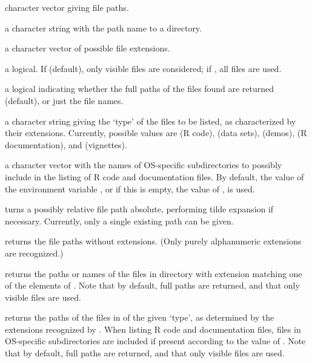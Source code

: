 %
\begin{Arguments}
\begin{ldescription}
\item[\code{x}] character vector giving file paths.
\item[\code{dir}] a character string with the path name to a directory.
\item[\code{exts}] a character vector of possible file extensions.
\item[\code{all.files}] a logical.  If  (default), only visible
files are considered; if , all files are used.
\item[\code{full.names}] a logical indicating whether the full paths of the
files found are returned (default), or just the file names.
\item[\code{type}] a character string giving the `type' of the files
to be listed, as characterized by their extensions.  Currently,
possible values are  (R code),  (data
sets),  (demos),  (R documentation), and
 (vignettes).
\item[\code{OS\_subdirs}] a character vector with the names of OS-specific
subdirectories to possibly include in the listing of R code and
documentation files.  By default, the value of the environment
variable , or if this is empty, the value of
, is used.
\end{ldescription}
\end{Arguments}
%
\begin{Details}\relax
{} turns a possibly relative file path
absolute, performing tilde expansion if necessary.  Currently, only a
single existing path can be given.

 returns the file paths without extensions.
(Only purely alphanumeric extensions are recognized.)

 returns the paths or names of the files in
directory  with extension matching one of the elements of
.  Note that by default, full paths are returned, and that
only visible files are used.

 returns the paths of the files in 
of the given `type', as determined by the extensions recognized
by \R{}.  When listing R code and documentation files, files in
OS-specific subdirectories are included if present according to the
value of .  Note that by default, full paths are
returned, and that only visible files are used.
\end{Details}
